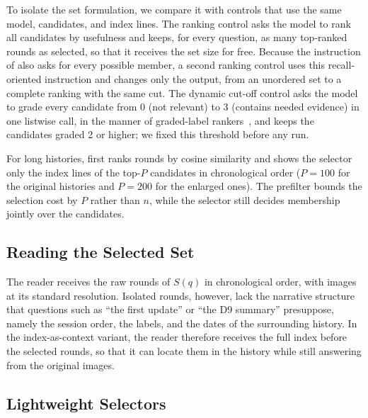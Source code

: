 To isolate the set formulation, we compare it with controls that use the same model, candidates, and index lines. The ranking control asks the model to rank all candidates by usefulness and keeps, for every question, as many top-ranked rounds as \qss{} selected, so that it receives the set size for free. Because the instruction of \qss{} also asks for every possible member, a second ranking control uses this recall-oriented instruction and changes only the output, from an unordered set to a complete ranking with the same cut. The dynamic cut-off control asks the model to grade every candidate from 0 (not relevant) to 3 (contains needed evidence) in one listwise call, in the manner of graded-label rankers~\citep{zhuang2024beyond}, and keeps the candidates graded 2 or higher; we fixed this threshold before any run.

For long histories, \qss{} first ranks rounds by cosine similarity and shows the selector only the index lines of the top-$P$ candidates in chronological order ($P{=}100$ for the original histories and $P{=}200$ for the enlarged ones). The prefilter bounds the selection cost by $P$ rather than $n$, while the selector still decides membership jointly over the candidates.

\subsection{Reading the Selected Set}
\label{sec:read}

The reader receives the raw rounds of $S(q)$ in chronological order, with images at its standard resolution. Isolated rounds, however, lack the narrative structure that questions such as ``the first update'' or ``the D9 summary'' presuppose, namely the session order, the labels, and the dates of the surrounding history. In the index-as-context variant, the reader therefore receives the full index before the selected rounds, so that it can locate them in the history while still answering from the original images.

\subsection{Lightweight Selectors}
\label{sec:light}

